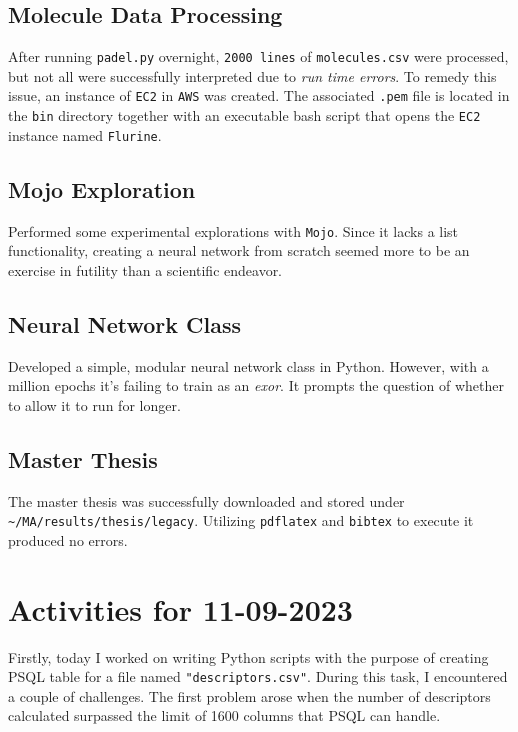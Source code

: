 \documentclass{article}
\begin{document}
\subsection*{Molecule Data Processing}
After running \texttt{padel.py} overnight, \texttt{2000 lines} of \texttt{molecules.csv} were processed, but not all were successfully interpreted due to \textit{run time errors}. To remedy this issue, an instance of \texttt{EC2} in \texttt{AWS} was created. The associated \texttt{.pem} file is located in the \texttt{bin} directory together with an executable bash script that opens the \texttt{EC2} instance named \texttt{Flurine}.

\subsection*{Mojo Exploration}
Performed some experimental explorations with \texttt{Mojo}. Since it lacks a list functionality, creating a neural network from scratch seemed more to be an exercise in futility than a scientific endeavor. 

\subsection*{Neural Network Class}
Developed a simple, modular neural network class in Python. However, with a million epochs it's failing to train as an \textit{exor}. It prompts the question of whether to allow it to run for longer.  

\subsection*{Master Thesis}
The master thesis was successfully downloaded and stored under \newline
\verb|~/MA/results/thesis/legacy|.\newline 
Utilizing \texttt{pdflatex} and \texttt{bibtex} to execute it produced no errors.

\section*{Activities for 11-09-2023}
Firstly, today I worked on writing Python scripts with the purpose of creating PSQL table for a file named \texttt{"descriptors.csv"}. During this task, I encountered a couple of challenges. The first problem arose when the number of descriptors calculated surpassed the limit of 1600 columns that PSQL can handle. 
\end{document}
